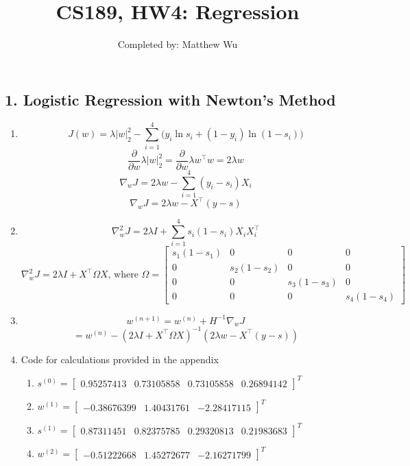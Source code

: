 \documentclass{article}
\title{CS189, HW4: Regression}
\author{ Completed by: Matthew Wu}
\date{}
\begin{document}
\maketitle

\subsection*{1. Logistic Regression with Newton's Method}
\begin{enumerate}[label=\arabic*)]
\item
$$J(w)=\lambda |w|_2^2-\sum_{i=1}^4\bigg(y_i \ln s_i+(1-y_i)\ln(1-s_i)\bigg)$$
$$\frac{\partial}{\partial w} \lambda |w|_2^2 = \frac{\partial}{\partial w} \lambda w^\top w=2\lambda w$$
$$\nabla_wJ=2\lambda w - \sum_{i=1}^4(y_i-s_i)X_i$$
$$\nabla_wJ=2\lambda w - X^\top (y-s)$$
\item
$$\nabla_w^2J=2\lambda I + \sum_{i=1}^4 s_i(1-s_i)X_iX_i^\top$$
$$\nabla_w^2J=2\lambda I + X^\top\Omega X\text{, where }\Omega=
\begin{bmatrix}
s_1(1-s_1) & 0 & 0 & 0\\
0 & s_2(1-s_2) & 0 & 0\\
0 & 0 & s_3(1-s_3) & 0\\
0 & 0 & 0 & s_4(1-s_4)
\end{bmatrix}$$
\item
$$w^{(n+1)}=w^{(n)}+H^{-1}\nabla_wJ$$
$$=w^{(n)}-(2\lambda I + X^\top \Omega X)^{-1}(2\lambda w - X^\top(y-s))$$
\item
Code for calculations provided in the appendix
\begin{enumerate}[label=\alph*)]
\item $s^{(0)}=\begin{bmatrix}0.95257413 & 0.73105858 & 0.73105858 & 0.26894142\end{bmatrix}^T$
\item $w^{(1)}=\begin{bmatrix}-0.38676399 & 1.40431761 & -2.28417115\end{bmatrix}^T$
\item $s^{(1)}=\begin{bmatrix}0.87311451 & 0.82375785 & 0.29320813 & 0.21983683\end{bmatrix}^T$
\item $w^{(2)}=\begin{bmatrix}-0.51222668 & 1.45272677 & -2.16271799\end{bmatrix}^T$
\end{enumerate}
\end{enumerate}
\end{document}
